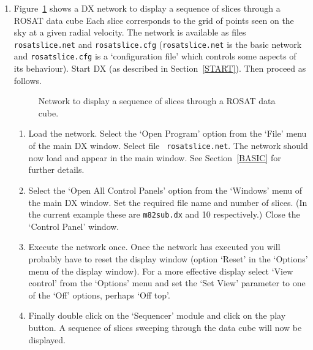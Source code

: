 \begin{enumerate}
  \item Figure~\ref{ROSATSLICE} shows a DX network to display a sequence
   of slices through a ROSAT data cube Each slice corresponds to the
   grid of points seen on the sky at a given radial velocity.  The network
   is available as files {\tt rosatslice.net} and {\tt rosatslice.cfg}
   ({\tt rosatslice.net} is the basic network and {\tt rosatslice.cfg} is
   a `configuration file' which controls some aspects of its behaviour).
   Start DX (as described in Section~\ref{START}).  Then proceed as
   follows.

  \begin{figure}[htbp]

  \begin{center}
  \leavevmode
  \epsfxsize=450pt
  \end{center}

  \caption[Network to display a sequence of slices through a ROSAT 
   data cube.]{Network to display a sequence of slices through a ROSAT
   data cube. \label{ROSATSLICE} }

  \end{figure}

  \begin{enumerate}

    \item Load the network.  Select the `Open Program' option from the
     `File' menu of the main DX window.  Select file {\tt
     rosatslice.net}.  The network should now load and appear in the
     main window.  See Section~\ref{BASIC} for further details.

    \item Select the `Open All Control Panels' option from the `Windows'
     menu of the main DX window.  Set the required file name and
     number of slices.  (In the current example these are {\tt m82sub.dx}
     and 10 respectively.)  Close the `Control Panel' window.

    \item Execute the network once.  Once the network has executed you
     will probably have to reset the display window (option `Reset' in
     the `Options' menu of the display window).  For a more effective
     display select `View control' from the `Options' menu and set the
     `Set View' parameter to one of the `Off' options, perhaps `Off top'.

    \item Finally double click on the `Sequencer' module and click on
     the play button.  A sequence of slices sweeping through the data
     cube will now be displayed.


\end{enumerate}
\end{enumerate}
